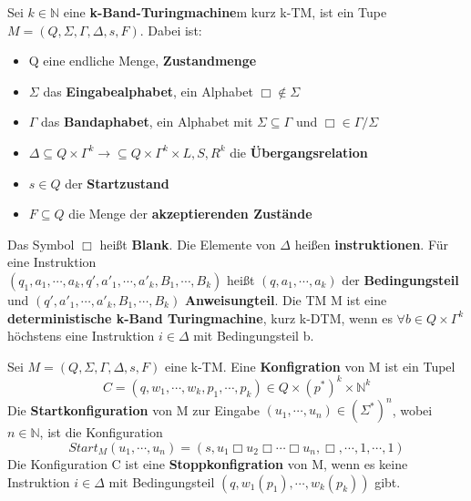   Sei \(k \in \mathbb{N}\) eine \textbf{k-Band-Turingmachine}m kurz k-TM, ist ein Tupe \(M = (Q, \Sigma, \varGamma, \Delta, s, F )\). Dabei ist:
  \begin{itemize}
    \item Q eine endliche Menge, \textbf{Zustandmenge}
    \item \(\Sigma\) das \textbf{Eingabealphabet}, ein Alphabet \(\Box \not \in \Sigma\)
    \item \(\varGamma\) das \textbf{Bandaphabet}, ein Alphabet mit \(\Sigma \subseteq \varGamma\) und \(\Box \in \varGamma / \Sigma\) 
    \item \(\Delta \subseteq Q \times \varGamma^{k} \rightarrow \subseteq Q \times \varGamma^{k} \times {L, S, R}^{k}\) die \textbf{Übergangsrelation}
    \item \(s \in Q\) der \textbf{Startzustand}
    \item \(F \subseteq Q\) die Menge der \textbf{akzeptierenden Zustände} 
  \end{itemize}
  \noindent Das Symbol \(\Box\) heißt \textbf{Blank}. Die Elemente von \(\Delta\) heißen \textbf{instruktionen}. Für eine Instruktion\\ \((q_{1}, a_{1}, \cdots, a_{k}, q', a'_{1}, \cdots, a'_{k}, B_{1}, \cdots, B_{k})\) heißt \((q, a_1, \cdots, a_k)\) der \textbf{Bedingungsteil} und \((q', a'_1, \cdots, a'_k, B_1, \cdots, B_k)\) \textbf{Anweisungteil}. Die TM M ist eine \textbf{deterministische k-Band Turingmachine}, kurz k-DTM, wenn es \(\forall b \in Q \times \varGamma^{k}\) höchstens eine Instruktion \(i \in \Delta\) mit Bedingungsteil b.

  Sei \(M = (Q, \Sigma, \Gamma, \Delta, s, F)\) eine k-TM. Eine \textbf{Konfigration} von M ist ein Tupel 
  \[
    C = (q, w_{1}, \cdots, w_{k}, p_{1}, \cdots, p_{k}) \in Q \times (p^{*})^{k} \times \mathbb{N}^{k}
  \] 
  Die \textbf{Startkonfiguration} von M zur Eingabe \((u_{1}, \cdots, u_{n}) \in (\Sigma^{*})^{n}\), wobei \(n \in \mathbb{N}\), ist die Konfiguration 
  \[
    Start_{M}(u_{1}, \cdots, u_{n}) = (s, u_{1} \Box u_{2} \Box \cdots \Box u_{n}, \Box, \cdots, 1, \cdots, 1)
  \] 
  Die Konfiguration C ist eine \textbf{Stoppkonfigration} von M, wenn es keine Instruktion \(i \in \Delta\) mit Bedingungsteil \((q, w_{1}(p_{1}), \cdots, w_{k}(p_{k}))\) gibt.

